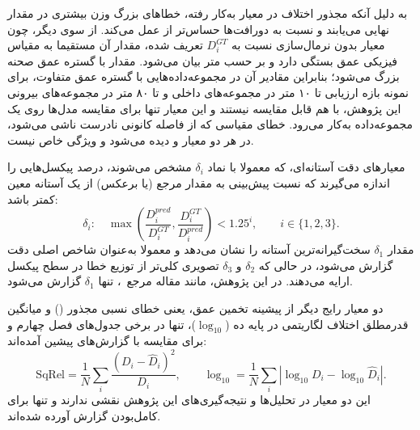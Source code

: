 به دلیل آنکه مجذور اختلاف در معیار  به‌کار رفته، خطاهای بزرگ وزن بیشتری در مقدار نهایی می‌یابند و  نسبت به دورافت‌ها حساس‌تر از  عمل می‌کند. از سوی دیگر، چون معیار  بدون نرمال‌سازی نسبت به $D_i^{GT}$ تعریف شده، مقدار آن مستقیما به مقیاس فیزیکی عمق بستگی دارد و بر حسب متر بیان می‌شود. مقدار  با گستره عمق صحنه بزرگ می‌شود؛ بنابراین مقادیر آن در مجموعه‌داده‌هایی با گستره عمق متفاوت، برای نمونه بازه ارزیابی تا ۱۰ متر در مجموعه‌های داخلی و تا ۸۰ متر در مجموعه‌های بیرونی این پژوهش، با هم قابل مقایسه نیستند و این معیار تنها برای مقایسه مدل‌ها روی یک مجموعه‌داده به‌کار می‌رود. خطای مقیاسی که از فاصله کانونی نادرست ناشی می‌شود، در هر دو معیار  و  دیده می‌شود و ویژگی خاص  نیست.

معیارهای دقت آستانه‌ای، که معمولا با نماد $\delta_i$ مشخص می‌شوند، درصد پیکسل‌هایی را اندازه می‌گیرند که نسبت پیش‌بینی به مقدار مرجع (یا برعکس) از یک آستانه معین کمتر باشد:
\begin{equation}
\delta_i:\quad \max\left(\frac{D_i^{pred}}{D_i^{GT}}, \frac{D_i^{GT}}{D_i^{pred}}\right) < 1.25^i, \qquad i \in \{1, 2, 3\}.
\end{equation}
مقدار $\delta_1$ سخت‌گیرانه‌ترین آستانه را نشان می‌دهد و معمولا به‌عنوان شاخص اصلی دقت گزارش می‌شود، در حالی که $\delta_2$ و $\delta_3$ تصویری کلی‌تر از توزیع خطا در سطح پیکسل ارایه می‌دهند. در این پژوهش، مانند مقاله مرجع~\cite{DepthAnythingV2}، تنها $\delta_1$ گزارش می‌شود.

دو معیار رایج دیگر از پیشینه تخمین عمق، یعنی خطای نسبی مجذور () و میانگین قدرمطلق اختلاف لگاریتمی در پایه ده ($\log_{10}$)، تنها در برخی جدول‌های فصل چهارم و برای مقایسه با گزارش‌های پیشین آمده‌اند:
\begin{equation}
 \mathrm{SqRel}=\frac{1}{N}\sum_i\frac{(D_i-\hat D_i)^2}{D_i},\qquad
 \log_{10}=\frac{1}{N}\sum_i\left|\log_{10} D_i-\log_{10}\hat D_i\right|.
\end{equation}
این دو معیار در تحلیل‌ها و نتیجه‌گیری‌های این پژوهش نقشی ندارند و تنها برای کامل‌بودن گزارش آورده شده‌اند.

